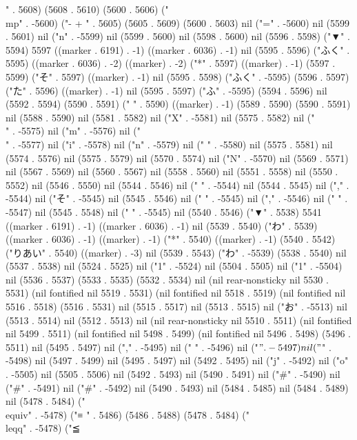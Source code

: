 " . 5608) (5608 . 5610) (5600 . 5606) ("\\mp" . -5600) ("-
+
" . 5605) (5605 . 5609) (5600 . 5603) nil ("=" . -5600) nil (5599 . 5601) nil ("n" . -5599) nil (5599 . 5600) nil (5598 . 5600) nil (5596 . 5598) ("▼" . 5594) 5597 ((marker . 6191) . -1) ((marker . 6036) . -1) nil (5595 . 5596) ("ふく" . 5595) ((marker . 6036) . -2) ((marker) . -2) ("*" . 5597) ((marker) . -1) (5597 . 5599) ("そ" . 5597) ((marker) . -1) nil (5595 . 5598) ("ふく" . -5595) (5596 . 5597) ("た" . 5596) ((marker) . -1) nil (5595 . 5597) ("ふ" . -5595) (5594 . 5596) nil (5592 . 5594) (5590 . 5591) (" " . 5590) ((marker) . -1) (5589 . 5590) (5590 . 5591) nil (5588 . 5590) nil (5581 . 5582) nil ("X" . -5581) nil (5575 . 5582) nil ("\\" . -5575) nil ("m" . -5576) nil ("\\" . -5577) nil ("i" . -5578) nil ("n" . -5579) nil (" " . -5580) nil (5575 . 5581) nil (5574 . 5576) nil (5575 . 5579) nil (5570 . 5574) nil ("N" . -5570) nil (5569 . 5571) nil (5567 . 5569) nil (5560 . 5567) nil (5558 . 5560) nil (5551 . 5558) nil (5550 . 5552) nil (5546 . 5550) nil (5544 . 5546) nil (" " . -5544) nil (5544 . 5545) nil ("," . -5544) nil ("そ" . -5545) nil (5545 . 5546) nil (" " . -5545) nil ("," . -5546) nil (" " . -5547) nil (5545 . 5548) nil (" " . -5545) nil (5540 . 5546) ("▼" . 5538) 5541 ((marker . 6191) . -1) ((marker . 6036) . -1) nil (5539 . 5540) ("わ" . 5539) ((marker . 6036) . -1) ((marker) . -1) ("*" . 5540) ((marker) . -1) (5540 . 5542) ("りあい" . 5540) ((marker) . -3) nil (5539 . 5543) ("わ" . -5539) (5538 . 5540) nil (5537 . 5538) nil (5524 . 5525) nil ("1" . -5524) nil (5504 . 5505) nil ("1" . -5504) nil (5536 . 5537) (5533 . 5535) (5532 . 5534) nil (nil rear-nonsticky nil 5530 . 5531) (nil fontified nil 5519 . 5531) (nil fontified nil 5518 . 5519) (nil fontified nil 5516 . 5518) (5516 . 5531) nil (5515 . 5517) nil (5513 . 5515) nil ("お" . -5513) nil (5513 . 5514) nil (5512 . 5513) nil (nil rear-nonsticky nil 5510 . 5511) (nil fontified nil 5499 . 5511) (nil fontified nil 5498 . 5499) (nil fontified nil 5496 . 5498) (5496 . 5511) nil (5495 . 5497) nil ("," . -5495) nil (" " . -5496) nil ("$" . -5497) nil ("$" . -5498) nil (5497 . 5499) nil (5495 . 5497) nil (5492 . 5495) nil ("j" . -5492) nil ("o" . -5505) nil (5505 . 5506) nil (5492 . 5493) nil (5490 . 5491) nil ("#" . -5490) nil ("#" . -5491) nil ("#" . -5492) nil (5490 . 5493) nil (5484 . 5485) nil (5484 . 5489) nil (5478 . 5484) ("\\equiv" . -5478) ("≡
" . 5486) (5486 . 5488) (5478 . 5484) ("\\leqq" . -5478) ("≦
